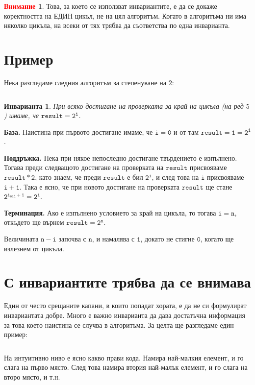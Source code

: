 \documentclass{article}
\theoremstyle{definition}
\newtheorem*{warning}{\textcolor{red}{Внимание}}
\theoremstyle{plain}
\newtheorem*{invariant}{Инварианта}
\theoremstyle{remark}
\theoremstyle{definition}
\begin{document}
\begin{warning}
    Това, за което се използват инвариантите, е да се докаже коректността на ЕДИН цикъл, не на цял алгоритъм.
    Когато в алгоритъма ни има няколко цикъла, на всеки от тях трябва да съответства по една инварианта.
\end{warning}

\section*{Пример}

Нека разгледаме следния алгоритъм за степенуване на $2$:
\inputminted[linenos]{c++}{algorithms/pow2.cpp}

\begin{invariant}
    При всяко достигане на проверката за край на цикъла (на ред $5$) имаме, че $\mathtt{result = 2^i}$.
\end{invariant}

\textbf{База.}
Наистина при първото достигане имаме, че $\mathtt{i = 0}$ и от там $\mathtt{result = 1 = 2^i}$.

\textbf{Поддръжка.}
Нека при някое непоследно достигане твърдението е изпълнено.
Тогава преди следващото достигане на проверката на $\mathtt{result}$ присвояваме $\mathtt{result * 2}$, като знаем, че преди $\mathtt{result}$ е бил $\mathtt{2^i}$, и след това на $\mathtt{i}$ присвояваме $\mathtt{i + 1}$.
Така е ясно, че при новото достигане на проверката $\mathtt{result}$ ще стане $\mathtt{2^{i_{old} + 1} = 2^i}$.

\textbf{Терминация.}
Ако е изпълнено условието за край на цикъла, то тогава $\mathtt{i = n}$, откъдето ще върнем $\mathtt{result = 2^n}$.

Величината $\mathtt{n - i}$ започва с $\mathtt{n}$, и намалява с $\mathtt{1}$, докато не стигне $\mathtt{0}$, когато ще излезнем от цикъла.

\section*{С инвариантите трябва да се внимава}

Един от често срещаните капани, в които попадат хората, е да не си формулират инвариантата добре.
Много е важно инварианта да дава достатъчна информация за това което наистина се случва в алгоритъма.
За целта ще разгледаме един пример:
\inputminted[linenos]{c++}{algorithms/selection_sort.cpp}

На интуитивно ниво е ясно какво прави кода.
Намира най-малкия елемент, и го слага на първо място.
След това намира втория най-малък елемент, и го слага на второ място, и т.н.
\end{document}
